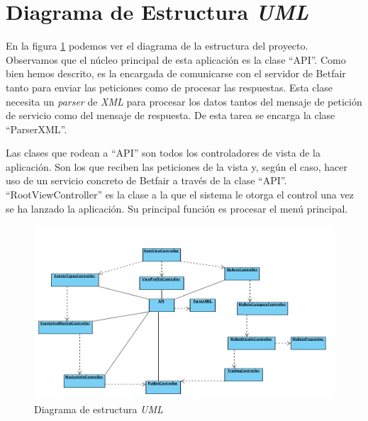 \section{Diagrama de Estructura \emph{UML}}
 En la figura \ref{fig:estructura} podemos ver el diagrama de la estructura del proyecto. Observamos que el núcleo principal de esta aplicación es la clase ``API''. Como bien hemos descrito, es la encargada de comunicarse con el servidor de Betfair tanto para enviar las peticiones como de procesar las respuestas. Esta clase necesita un \emph{parser} de \emph{XML} para procesar los datos tantos del mensaje de petición de servicio como del mensaje de respuesta. De esta tarea se encarga la clase ``ParserXML''.
 
  Las clases que rodean a ``API'' son todos los controladores de vista de la aplicación. Son los que reciben las peticiones de la vista y, según el caso, hacer uso de un servicio concreto de Betfair a través de la clase ``API''. ``RootViewController'' es la clase a la que el sistema le otorga el control una vez se ha lanzado la aplicación. Su principal función es procesar el menú principal.

 \begin{figure}[h!]
    \centering
       \includegraphics[width=0.95\linewidth]{./images/UML_Diagram.png}
     \caption{Diagrama de estructura \emph{UML}}
   \label{fig:estructura}
\end{figure}


